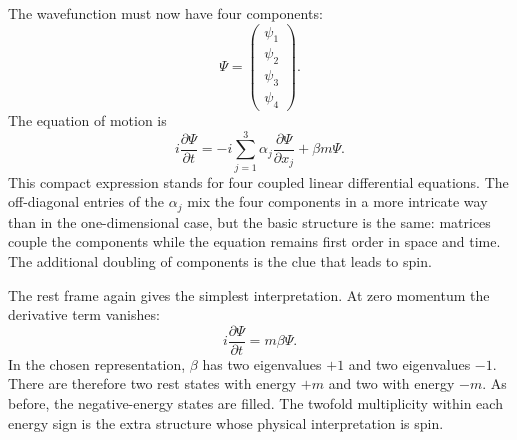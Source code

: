 The wavefunction must now have four components:
\begin{equation}
\Psi=
\begin{pmatrix}
\psi_1\\
\psi_2\\
\psi_3\\
\psi_4
\end{pmatrix}.
\end{equation}
The equation of motion is
\begin{equation}
i\frac{\partial\Psi}{\partial t}
=
-i\sum_{j=1}^{3}\alpha_j
\frac{\partial\Psi}{\partial x_j}
+\beta m\Psi.
\end{equation}
This compact expression stands for four coupled linear differential equations. The off-diagonal entries of the \(\alpha_j\) mix the four components in a more intricate way than in the one-dimensional case, but the basic structure is the same: matrices couple the components while the equation remains first order in space and time. The additional doubling of components is the clue that leads to spin.

\begin{classroomqa}
\end{classroomqa}

The rest frame again gives the simplest interpretation. At zero momentum the derivative term vanishes:
\begin{equation}
i\frac{\partial\Psi}{\partial t}=m\beta\Psi.
\end{equation}
In the chosen representation, \(\beta\) has two eigenvalues \(+1\) and two eigenvalues \(-1\). There are therefore two rest states with energy \(+m\) and two with energy \(-m\). As before, the negative-energy states are filled. The twofold multiplicity within each energy sign is the extra structure whose physical interpretation is spin.

\begin{classroomqa}
\end{classroomqa}

